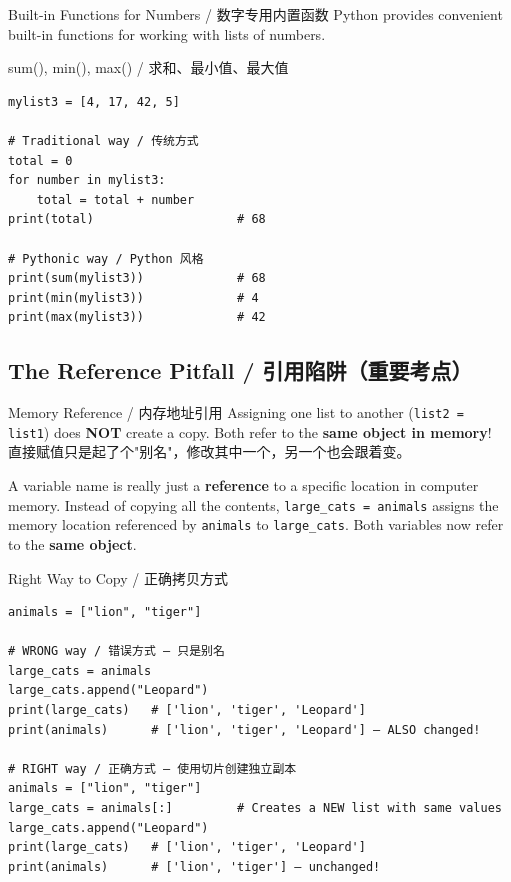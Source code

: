 \documentclass[11pt,a4paper]{article}
\begin{document}
\begin{concept}{Built-in Functions for Numbers / 数字专用内置函数}
    Python provides convenient built-in functions for working with lists of numbers.
\end{concept}

\begin{examplebox}{sum(), min(), max() / 求和、最小值、最大值}
\begin{lstlisting}
mylist3 = [4, 17, 42, 5]

# Traditional way / 传统方式
total = 0
for number in mylist3:
    total = total + number
print(total)                    # 68

# Pythonic way / Python 风格
print(sum(mylist3))             # 68
print(min(mylist3))             # 4
print(max(mylist3))             # 42
\end{lstlisting}
\end{examplebox}

\subsection{The Reference Pitfall / 引用陷阱（重要考点）}

\begin{warning}{Memory Reference / 内存地址引用}
    Assigning one list to another (\texttt{list2 = list1}) does \textbf{NOT} create a copy. Both refer to the \textbf{same object in memory}! \\
    直接赋值只是起了个"别名"，修改其中一个，另一个也会跟着变。

    A variable name is really just a \textbf{reference} to a specific location in computer memory. Instead of copying all the contents, \texttt{large\_cats = animals} assigns the memory location referenced by \texttt{animals} to \texttt{large\_cats}. Both variables now refer to the \textbf{same object}.
\end{warning}

\begin{examplebox}{Right Way to Copy / 正确拷贝方式}
\begin{lstlisting}
animals = ["lion", "tiger"]

# WRONG way / 错误方式 — 只是别名
large_cats = animals
large_cats.append("Leopard")
print(large_cats)   # ['lion', 'tiger', 'Leopard']
print(animals)      # ['lion', 'tiger', 'Leopard'] — ALSO changed!

# RIGHT way / 正确方式 — 使用切片创建独立副本
animals = ["lion", "tiger"]
large_cats = animals[:]         # Creates a NEW list with same values
large_cats.append("Leopard")
print(large_cats)   # ['lion', 'tiger', 'Leopard']
print(animals)      # ['lion', 'tiger'] — unchanged!
\end{lstlisting}
\end{examplebox}
\end{document}
